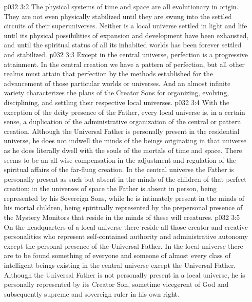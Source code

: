 \vs p032 3:2 The physical systems of time and space are all evolutionary in origin. They are not even physically stabilized until they are swung into the settled circuits of their superuniverses. Neither is a local universe settled in light and life until its physical possibilities of expansion and development have been exhausted, and until the spiritual status of all its inhabited worlds has been forever settled and stabilized.
\vs p032 3:3 Except in the central universe, perfection is a progressive attainment. In the central creation we have a pattern of perfection, but all other realms must attain that perfection by the methods established for the advancement of those particular worlds or universes. And an almost infinite variety characterizes the plans of the Creator Sons for organizing, evolving, disciplining, and settling their respective local universes.
\vs p032 3:4 \pc With the exception of the deity presence of the Father, every local universe is, in a certain sense, a duplication of the administrative organization of the central or pattern creation. Although the Universal Father is personally present in the residential universe, he does not indwell the minds of the beings originating in that universe as he does literally dwell with the souls of the mortals of time and space. There seems to be an all\hyp{}wise compensation in the adjustment and regulation of the spiritual affairs of the far\hyp{}flung creation. In the central universe the Father is personally present as such but absent in the minds of the children of that perfect creation; in the universes of space the Father is absent in person, being represented by his Sovereign Sons, while he is intimately present in the minds of his mortal children, being spiritually represented by the prepersonal presence of the Mystery Monitors that reside in the minds of these will creatures.
\vs p032 3:5 On the headquarters of a local universe there reside all those creator and creative personalities who represent self\hyp{}contained authority and administrative autonomy except the personal presence of the Universal Father. In the local universe there are to be found something of everyone and someone of almost every class of intelligent beings existing in the central universe except the Universal Father. Although the Universal Father is not personally present in a local universe, he is personally represented by its Creator Son, sometime vicegerent of God and subsequently supreme and sovereign ruler in his own right.
